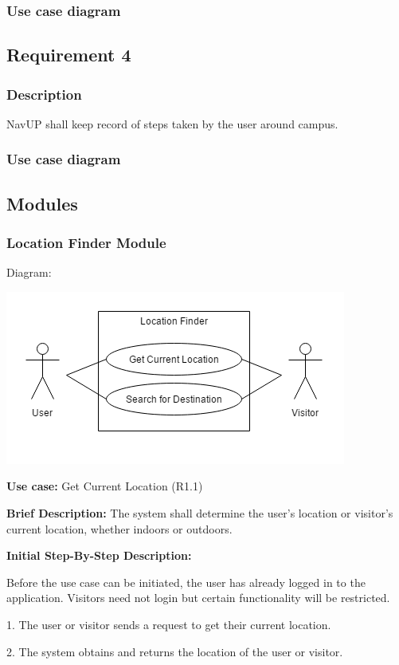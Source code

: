 \documentclass{article}
\begin{document}
        \subsubsection{Use case diagram}
        \pagebreak
        \subsection{Requirement 4}
        \subsubsection{Description}
        NavUP shall keep record of steps taken by the user around campus.
        \subsubsection{Use case diagram}
    
    \subsection{Modules}
    \subsubsection{Location Finder Module}
    Diagram:
    	
    \includegraphics[scale=.7]{LocationFinder}
    \begin{flushleft}
    \textbf{Use case:} Get Current Location (R1.1)
    \newline
    	
    \textbf{Brief Description:}
    \newline
    The system shall determine the user's location or visitor's 		current location, whether indoors or outdoors.
    \newline
    
    \textbf{Initial Step-By-Step Description:}
    
    Before the use case can be initiated, the user has already logged in to the application. Visitors need not login but certain functionality will be restricted.
	\newline    
	
1. The user or visitor sends a request to get their current location.
    
2. The system obtains and returns the location of the user or visitor.
\end{flushleft}
\end{document}
